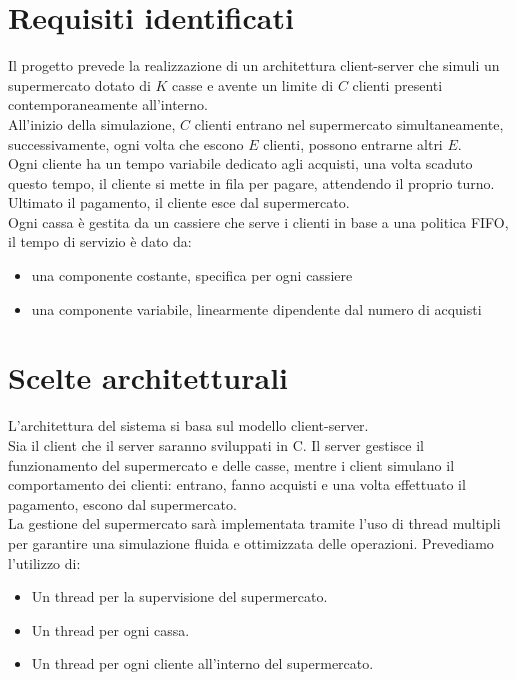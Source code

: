 \documentclass[a4paper, 12pt]{article}
\begin{document}
\section{Requisiti identificati}
Il progetto prevede la realizzazione di un architettura client-server che simuli 
un supermercato dotato di $K$ casse e avente un limite di $C$ clienti presenti 
contemporaneamente all'interno. \\
All'inizio della simulazione, $C$ clienti entrano nel supermercato 
simultaneamente, successivamente, ogni volta che escono $E$ clienti, possono 
entrarne altri $E$. \\
Ogni cliente ha un tempo variabile dedicato agli acquisti, una volta scaduto questo
tempo, il cliente si mette in fila per pagare, attendendo il proprio turno.
Ultimato il pagamento, il cliente esce dal supermercato. \\
Ogni cassa è gestita da un cassiere che serve i clienti in base a una politica FIFO,
il tempo di servizio è dato da:
\begin{itemize}[noitemsep,topsep=0pt,parsep=0pt,partopsep=0pt]
    \item una componente costante, specifica per ogni cassiere
    \item una componente variabile, linearmente dipendente dal numero di acquisti
\end{itemize}


\section{Scelte architetturali}
L'architettura del sistema si basa sul modello client-server. \\
Sia il client che il server saranno sviluppati in C. Il server gestisce il
funzionamento del supermercato e delle casse, mentre i client simulano il 
comportamento dei clienti: entrano, fanno acquisti e una volta effettuato il 
pagamento, escono dal supermercato. \\
La gestione del supermercato sarà implementata tramite l'uso di thread multipli
per garantire una simulazione fluida e ottimizzata delle operazioni.
Prevediamo l'utilizzo di:
\begin{itemize}[noitemsep,topsep=0pt,parsep=0pt,partopsep=0pt]
    \item Un thread per la supervisione del supermercato.
    \item Un thread per ogni cassa.
    \item Un thread per ogni cliente all'interno del supermercato.
\end{itemize}
\end{document}
